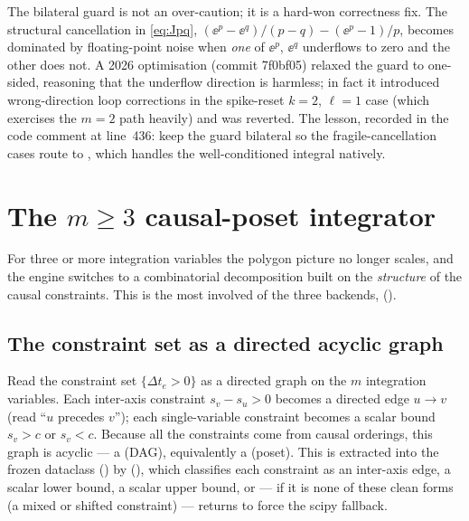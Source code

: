\begin{gotcha}
The bilateral guard is not an over-caution; it is a hard-won correctness fix. The
structural cancellation in \eqref{eq:Jpq}, $(\ee^p-\ee^q)/(p-q) -
(\ee^p-1)/p$, becomes dominated by floating-point noise when \emph{one} of
$\ee^p$, $\ee^q$ underflows to zero and the other does not. A 2026 optimisation
(commit 7f0bf05) relaxed the guard to one-sided, reasoning that the underflow
direction is harmless; in fact it introduced wrong-direction loop corrections in
the spike-reset $k=2$, $\ell=1$ case (which exercises the $m=2$ path heavily) and
was reverted. The lesson, recorded in the code comment at line~436: keep the
guard bilateral so the fragile-cancellation cases route to ,
which handles the well-conditioned integral natively.
\end{gotcha}

\section{The $m\ge 3$ causal-poset integrator}\label{sec:m3}

For three or more integration variables the polygon picture no longer scales, and
the engine switches to a combinatorial decomposition built on the
\emph{structure} of the causal constraints. This is the most involved of the
three backends, 
().

\subsection{The constraint set as a directed acyclic graph}

Read the constraint set $\{\Delta t_e > 0\}$ as a directed graph on the $m$
integration variables. Each inter-axis constraint $s_v - s_u > 0$ becomes a
directed edge $u\to v$ (read ``$u$ precedes $v$''); each single-variable
constraint becomes a scalar bound $s_v > c$ or $s_v < c$. Because all the
constraints come from causal orderings, this graph is acyclic --- a
 (DAG), equivalently a  (poset).
This is extracted into the frozen  dataclass
() by 
(), which classifies each constraint as an inter-axis
edge, a scalar lower bound, a scalar upper bound, or --- if it is none of these
clean forms (a mixed or shifted constraint) --- returns  to force the
scipy fallback.

